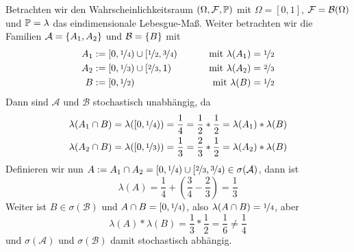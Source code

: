 \begin{exercisePage}
	Betrachten wir den Wahrscheinlichkeitsraum $(\Omega , \ereignisF , \P)$ mit $\Omega = [0,1]$, $\ereignisF = \borel{\Omega}$ und $\P = \lambda$ das eindimensionale Lebesgue-Maß. Weiter betrachten wir die Familien $\mathcal{A} = \menge{A_1 , A_2}$ und $\mathcal{B} = \menge{B}$ mit
	\begin{equation*}
		\begin{aligned}
			A_1 &\defeq [0, \lfrac{1}{4}) \cup [\lfrac{1}{2}, \lfrac{3}{4} ) \qquad &\mit \lambda(A_1) &= \lfrac{1}{2} \\
			A_2 &\defeq [0, \lfrac{1}{3}) \cup [\lfrac{2}{3}, 1 ) &\mit \lambda(A_2) &= \lfrac{2}{3} \\
			B &\defeq [0, \lfrac{1}{2}) &\mit \lambda(B) &= \lfrac{1}{2}
		\end{aligned}
	\end{equation*} 
	Dann sind $\mathcal{A}$ und $\mathcal{B}$ stochastisch unabhängig, da
	\begin{equation*}
		\begin{aligned}
			\lambda(A_1 \cap B) = \lambda ( [0 , \lfrac{1}{4}) ) = \frac{1}{4} = \frac{1}{2} * \frac{1}{2} = \lambda(A_1) * \lambda(B) \\
			\lambda(A_2 \cap B) = \lambda ( [0 , \lfrac{1}{3}) ) = \frac{1}{3} = \frac{2}{3} * \frac{1}{2} = \lambda(A_2) * \lambda(B)
		\end{aligned}
	\end{equation*}
	Definieren wir nun $A \defeq A_1 \cap A_2 = [0, \lfrac{1}{4}) \cup [\lfrac{2}{3} , \lfrac{3}{4} ) \in \sigma(\mathcal{A})$, dann ist
	\begin{equation*}
		\lambda(A) = \frac{1}{4} + \left( \frac{3}{4} - \frac{2}{3} \right) = \frac{1}{3}
	\end{equation*}
	Weiter ist $B \in \sigma(\mathcal{B})$ und $A \cap B = [0 , \lfrac{1}{4})$, also $\lambda(A \cap B) =  \lfrac{1}{4}$, aber
	\begin{equation*}
		\lambda(A) * \lambda(B) = \frac{1}{3} * \frac{1}{2} = \frac{1}{6} \neq \frac{1}{4}
	\end{equation*}
	und $\sigma(\mathcal{A})$ und $\sigma(\mathcal{B})$ damit stochastisch abhängig.
\end{exercisePage}